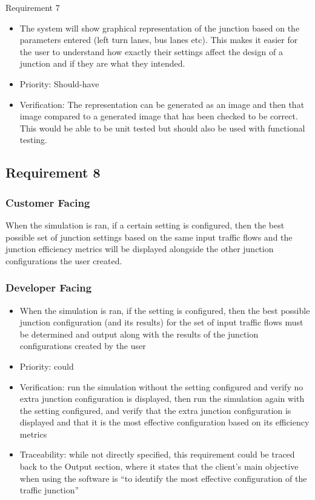 \documentclass{article}
\begin{document}
Requirement 7
\begin{itemize}
  \item The system will show graphical representation of the junction based on the parameters entered (left turn lanes, bus lanes etc). This makes it easier for the user to understand how exactly their settings affect the design of a junction and if they are what they intended.
  \item Priority: Should-have 
  \item Verification: The representation can be generated as an image and then that image compared to a generated image that has been checked to be correct. This would be able to be unit tested but should also be used  with functional testing.
\end{itemize}

\subsection{Requirement 8}
\subsubsection{Customer Facing}
When the simulation is ran, if a certain setting is configured, then the best 
possible set of junction settings based on the same input traffic flows and the 
junction efficiency metrics will be displayed alongside the other junction 
configurations the user created.
\subsubsection{Developer Facing}
\begin{itemize}
  \item When the simulation is ran, if the setting is configured, then the best 
  possible junction configuration (and its results) for the set of input traffic 
  flows must be determined and output along with the results of the junction 
  configurations created by the user
  \item Priority: could
  \item Verification: run the simulation without the setting configured and verify 
  no extra junction configuration is displayed, then run the simulation again with 
  the setting configured, and verify that the extra junction configuration is displayed 
  and that it is the most effective configuration based on its efficiency metrics
  \item Traceability: while not directly specified, this requirement could be traced back 
  to the Output section, where it states that the client’s main objective when using 
  the software is “to identify the most effective configuration of the traffic junction”
\end{itemize}
\end{document}
